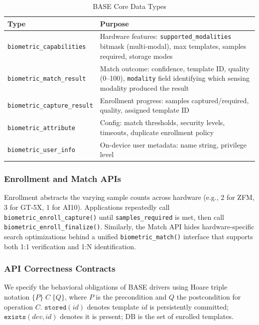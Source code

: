 \begin{table}
\caption{BASE Core Data Types}
\label{tab:data_types}
\centering
\renewcommand{\arraystretch}{1.4}
\setlength{\tabcolsep}{5pt}
\begin{tabularx}{\columnwidth}{|l|X|}
\hline
\textbf{Type} & \textbf{Purpose} \\
\hline
\texttt{biometric\_capabilities} & Hardware features: \texttt{supported\_modalities} bitmask (multi-modal), max templates, samples required, storage modes \\
\hline
\texttt{biometric\_match\_result} & Match outcome: confidence, template ID, quality (0--100), \texttt{modality} field identifying which sensing modality produced the result \\
\hline
\texttt{biometric\_capture\_result} & Enrollment progress: samples captured/required, quality, assigned template ID \\
\hline
\texttt{biometric\_attribute} & Config: match thresholds, security levels, timeouts, duplicate enrollment policy \\
\hline
\texttt{biometric\_user\_info} & On-device user metadata: name string, privilege level \\
\hline
\end{tabularx}
\end{table}

\subsubsection{Enrollment and Match APIs}
Enrollment abstracts the varying sample counts across hardware (e.g., 2 for ZFM, 3 for GT-5X, 1 for AI10). Applications repeatedly call \texttt{biometric\_enroll\_capture()} until \texttt{samples\_required} is met, then call \texttt{biometric\_enroll\_finalize()}. Similarly, the Match API hides hardware-specific search optimizations behind a unified \texttt{biometric\_match()} interface that supports both 1:1 verification and 1:N identification.

\subsubsection{API Correctness Contracts}

We specify the behavioral obligations of BASE drivers using Hoare triple notation $\{P\}\;C\;\{Q\}$, where $P$ is the precondition and $Q$ the postcondition for operation $C$. $\mathtt{stored}(\mathit{id})$ denotes template $\mathit{id}$ is persistently committed; $\mathtt{exists}(\mathit{dev},\mathit{id})$ denotes it is present; $\mathrm{DB}$ is the set of enrolled templates.

